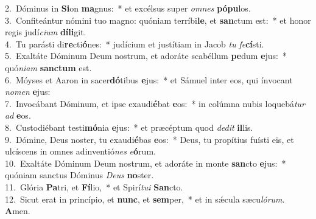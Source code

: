 {2.~}Dóminus in \textbf{Si}on \textbf{ma}gnus:~* et excélsus super \textit{om}\textit{nes} \textbf{pó}\textbf{pu}los.\\
{3.~}Confiteántur nómini tuo magno: quóniam terríbi\textbf{le}, et \textbf{san}ctum est:~* et honor regis judí\textit{ci}\textit{um} \textbf{dí}\textbf{li}git.\\
{4.~}Tu parásti di\textbf{re}cti\textbf{ó}nes:~* judícium et justítiam in Jacob \textit{tu} \textit{fe}\textbf{cí}sti.\\
{5.~}Exaltáte Dóminum Deum nostrum, et adoráte scabéllum \textbf{pe}dum \textbf{e}jus:~* quó\textit{ni}\textit{am} \textbf{san}\textbf{ctum} est.\\
{6.~}Móyses et Aaron in sacer\textbf{dó}tibus \textbf{e}jus:~* et Sámuel inter eos, qui ínvocant \textit{no}\textit{men} \textbf{e}jus:\\
{7.~}Invocábant Dóminum, et ipse exaudi\textbf{é}bat \textbf{e}os:~* in colúmna nubis loquebá\textit{tur} \textit{ad} \textbf{e}os.\\
{8.~}Custodiébant testi\textbf{mó}nia \textbf{e}jus:~* et præcéptum quod \textit{de}\textit{dit} \textbf{il}lis.\\
{9.~}Dómine, Deus noster, tu exaudi\textbf{é}bas \textbf{e}os:~* Deus, tu propítius fuísti eis, et ulcíscens in omnes adinventió\textit{nes} \textit{e}\textbf{ó}rum.\\
{10.~}Exaltáte Dóminum Deum nostrum, et adoráte in monte \textbf{san}cto \textbf{e}jus:~* quóniam sanctus Dóminus \textit{De}\textit{us} \textbf{no}ster.\\
{11.~}Glória \textbf{Pa}tri, et \textbf{Fí}lio,~* et Spirí\textit{tu}\textit{i} \textbf{San}cto.\\
{12.~}Sicut erat in princípio, et \textbf{nunc}, et \textbf{sem}per,~* et in sǽcula sæcu\textit{ló}\textit{rum}. \textbf{A}men.\\

